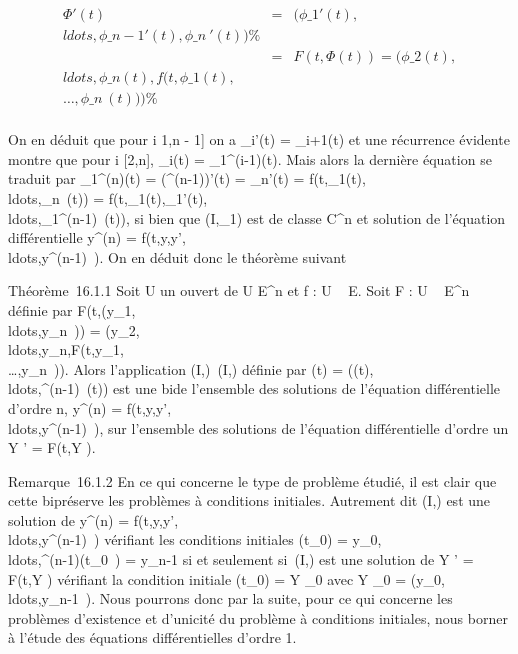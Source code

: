\documentclass[]{article}
\begin{document}
\begin{align*} \Phi'(t)& =&
(\phi\_1'(t),\\ldots,\phi\_n-1'(t),\phi\_n~'(t))
\%& \\ & =& F(t,\Phi(t)) =
(\phi\_2(t),\\ldots,\phi\_n(t),f(t,\phi\_1(t),\\\ldots,\phi\_n~(t)))\%&
\\ \end{align*}

On en déduit que pour i \in {[}1,n - 1{]} on a \phi\_i'(t) =
\phi\_i+1(t) et une récurrence évidente montre que pour i \in
{[}2,n{]}, \phi\_i(t) = \phi\_1^(i-1)(t). Mais alors la
dernière équation se traduit par \phi\_1^(n)(t) =
(\phi^(n-1))'(t) = \phi\_n'(t) =
f(t,\phi\_1(t),\\ldots,\phi\_n~(t))
=
f(t,\phi\_1(t),\phi\_1'(t),\\ldots,\phi\_1^(n-1)~(t)),
si bien que (I,\phi\_1) est de classe C^n et solution de
l'équation différentielle y^(n) =
f(t,y,y',\\ldots,y^(n-1)~).
On en déduit donc le théorème suivant

Théorème~16.1.1 Soit U un ouvert de U \times E^n et f : U \rightarrow~ E.
Soit F : U \rightarrow~ E^n définie par
F(t,(y\_1,\\ldots,y\_n~))
=
(y\_2,\\ldots,y\_n,F(t,y\_1,\\\ldots,y\_n~)).
Alors l'application (I,\phi)\mapsto~(I,\Phi) définie par
\Phi(t) =
(\phi(t),\\ldots,\phi^(n-1)~(t))
est une bi\jmathection de l'ensemble des solutions de l'équation
différentielle d'ordre n, y^(n) =
f(t,y,y',\\ldots,y^(n-1)~),
sur l'ensemble des solutions de l'équation différentielle d'ordre un Y '
= F(t,Y ).

Remarque~16.1.2 En ce qui concerne le type de problème étudié, il est
clair que cette bi\jmathection préserve les problèmes à conditions initiales.
Autrement dit (I,\phi) est une solution de y^(n) =
f(t,y,y',\\ldots,y^(n-1)~)
vérifiant les conditions initiales \phi(t\_0) =
y\_0,\\ldots,\phi^(n-1)(t\_0~)
= y\_n-1 si et seulement si~(I,\Phi) est une solution de Y ' =
F(t,Y ) vérifiant la condition initiale \Phi(t\_0) = Y \_0
avec Y \_0 =
(y\_0,\\ldots,y\_n-1~).
Nous pourrons donc par la suite, pour ce qui concerne les problèmes
d'existence et d'unicité du problème à conditions initiales, nous borner
à l'étude des équations différentielles d'ordre 1.
\end{document}
